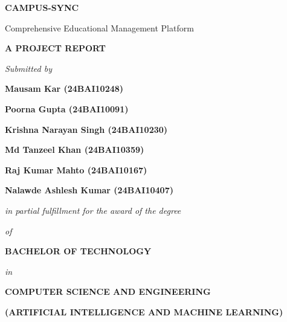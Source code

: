 
\begin{titlepage}
\centering
\vspace*{1cm}

{\Huge\bfseries\textcolor{titleblue}{CAMPUS-SYNC}}\par
\vspace{0.5cm}
{\LARGE\textcolor{titleblue}{Comprehensive Educational Management Platform}}\par
\vspace{1cm}

{\Large\textbf{A PROJECT REPORT}}\par
\vspace{1.5cm}

{\large\textit{Submitted by}}\par
\vspace{0.5cm}

{\Large\textbf{Mausam Kar (24BAI10248)}}\par
{\Large\textbf{Poorna Gupta (24BAI10091)}}\par
{\Large\textbf{Krishna Narayan Singh (24BAI10230)}}\par
{\Large\textbf{Md Tanzeel Khan (24BAI10359)}}\par
{\Large\textbf{Raj Kumar Mahto (24BAI10167)}}\par
{\Large\textbf{Nalawde Ashlesh Kumar (24BAI10407)}}\par

\vspace{1cm}

{\large\textit{in partial fulfillment for the award of the degree}}\par
{\large\textit{of}}\par
\vspace{0.5cm}

{\Large\textbf{BACHELOR OF TECHNOLOGY}}\par
\vspace{0.3cm}

{\large\textit{in}}\par
\vspace{0.3cm}

{\Large\textbf{COMPUTER SCIENCE AND ENGINEERING}}\par
{\Large\textbf{(ARTIFICIAL INTELLIGENCE AND MACHINE LEARNING)}}\par

\vspace{1cm}


\end{titlepage}
